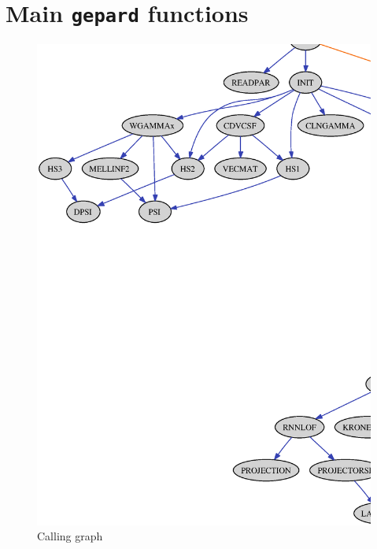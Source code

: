 \documentclass[12pt]{article}
\begin{document}
\section{Main \texttt{gepard} functions}

\begin{figure}[h]
\begin{center}
\includegraphics[scale=0.52]{callgraph}
\end{center}
\caption{Calling graph}
\label{fig:callgraph}
\end{figure}



%

%

\end{document}
